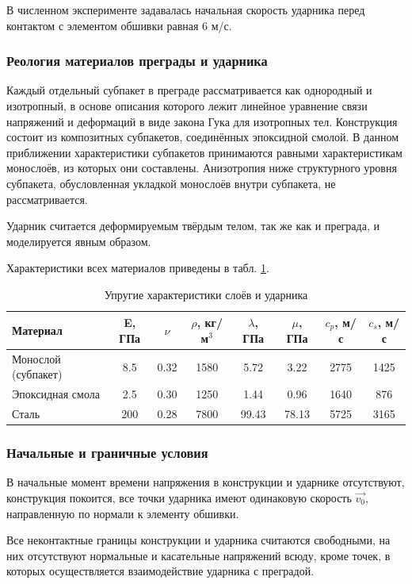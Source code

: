 В численном эксперименте задавалась начальная скорость ударника перед контактом с элементом обшивки равная 6 м/с.

\subsubsection*{Реология материалов преграды и ударника}

Каждый отдельный субпакет в преграде рассматривается как однородный и изотропный, в основе описания которого лежит линейное уравнение связи напряжений и деформаций в виде закона Гука для изотропных тел. Конструкция состоит из композитных субпакетов, соединённых эпоксидной смолой. В данном приближении характеристики субпакетов принимаются равными характеристикам монослоёв, из которых они составлены. Анизотропия ниже структурного уровня субпакета, обусловленная укладкой монослоёв внутри субпакета, не рассматривается.

Ударник считается деформируемым твёрдым телом, так же как и преграда, и моделируется явным образом.

Характеристики всех материалов приведены в табл. \ref{tbl:subpackage}.

\begin{table}[h]
\centering
\caption{Упругие характеристики слоёв и ударника}
\begin{tabular}{|p{3cm}|c|c|c|c|c|c|c|}
\hline
Материал & E, ГПа & $\nu$ & $\rho$, кг/м$^{3}$ & $\lambda$, ГПа & $\mu$, ГПа &
$c_p$, м/с & $c_s$, м/с \\
\hline
Монослой (субпакет) & 8.5 & 0.32 & 1580 & 5.72 & 3.22 & 2775 & 1425 \\
Эпоксидная смола & 2.5 & 0.30 & 1250 & 1.44 & 0.96 & 1640 & 876 \\
Сталь & 200 & 0.28 & 7800 & 99.43 & 78.13 & 5725 & 3165 \\
\hline
\end{tabular}
\label{tbl:subpackage}
\end{table}

\subsubsection*{Начальные и граничные условия}

В начальные момент времени напряжения в конструкции и ударнике отсутствуют, конструкция покоится, все точки ударника имеют одинаковую скорость $\vec{v_0}$, направленную по нормали к элементу обшивки.

Все неконтактные границы конструкции и ударника считаются свободными, на них отсутствуют нормальные и касательные напряжений всюду, кроме точек, в которых осуществляется взаимодействие ударника с преградой.


